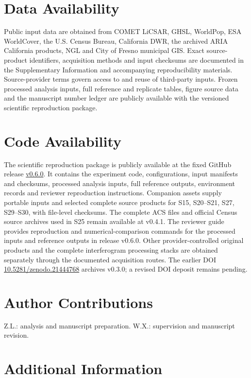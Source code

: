 \documentclass[pdflatex,lineno,sn-nature]{sn-jnl}
\begin{document}
\section*{Data Availability}
Public input data are obtained from COMET LiCSAR, GHSL, WorldPop, ESA WorldCover, the U.S. Census Bureau, California DWR, the archived ARIA California products, NGL and City of Fresno municipal GIS. Exact source-product identifiers, acquisition methods and input checksums are documented in the Supplementary Information and accompanying reproducibility materials. Source-provider terms govern access to and reuse of third-party inputs. Frozen processed analysis inputs, full reference and replicate tables, figure source data and the manuscript number ledger are publicly available with the versioned scientific reproduction package.

\section*{Code Availability}
The scientific reproduction package is publicly available at the fixed GitHub release \href{https://github.com/niubisile-wq/openinsar-observability-bias/releases/tag/v0.6.0}{v0.6.0}. It contains the experiment code, configurations, input manifests and checksums, processed analysis inputs, full reference outputs, environment records and reviewer reproduction instructions. Companion assets supply portable inputs and selected complete source products for S15, S20--S21, S27, S29--S30, with file-level checksums. The complete ACS files and official Census source archives used in S25 remain available at v0.4.1. The reviewer guide provides reproduction and numerical-comparison commands for the processed inputs and reference outputs in release v0.6.0. Other provider-controlled original products and the complete interferogram processing stacks are obtained separately through the documented acquisition routes. The earlier DOI \href{https://doi.org/10.5281/zenodo.21444768}{10.5281/zenodo.21444768} archives v0.3.0; a revised DOI deposit remains pending.
\def\bibfont{\small}

\section*{Author Contributions}
Z.L.: analysis and manuscript preparation. W.X.: supervision and manuscript revision.
\section*{Additional Information}
\end{document}
